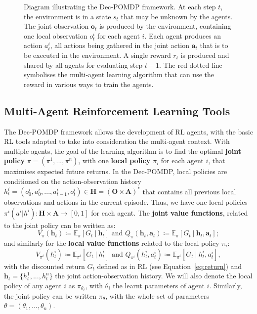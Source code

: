 \begin{figure}
    \centering
    
    \caption{Diagram illustrating the Dec-POMDP framework. At each step $t$, the environment is in a state $s_t$ that may be unknown by the agents. The joint observation $\mathbf{o}_t$ is produced by the environment, containing one local observation $o^i_t$ for each agent $i$. Each agent produces an action $a^i_t$, all actions being gathered in the joint action $\mathbf{a}_t$ that is to be executed in the environment. A single reward $r_t$ is produced and shared by all agents for evaluating step $t-1$. The red dotted line symbolises the multi-agent learning algorithm that can use the reward in various ways to train the agents.}
    \label{fig:DecPOMDP}
\end{figure}



\subsection{Multi-Agent Reinforcement Learning Tools}\label{sec:MAL:MARL_tools}

The Dec-POMDP framework allows the development of RL agents, with the basic RL tools adapted to take into consideration the multi-agent context. With multiple agents, the goal of the learning algorithm is to find the optimal \textbf{joint policy} $\pi=(\pi^1,...,\pi^n)$, with one \textbf{local policy} $\pi_i$ for each agent $i$, that maximises expected future returns. In the Dec-POMDP, local policies are conditioned on the action-observation history $h^i_t=(o^i_0,a^i_0,...,a^i_{t-1},o^i_t)\in \mathbf{H}=(\mathbf{O}\times\mathbf{A})^*$ that contains all previous local observations and actions in the current episode. Thus, we have one local policies $\pi^i(a^i|h^i):\mathbf{H}\times\mathbf{A}\rightarrow[0,1]$ for each agent. The \textbf{joint value functions}, related to the joint policy can be written as:
\begin{equation}
    V_\pi(\mathbf{h}_t)\coloneqq\mathbb{E}_\pi[G_t\ |\ \mathbf{h}_t]\text{ and }Q_\pi(\mathbf{h}_t,\mathbf{a}_t)\coloneqq\mathbb{E}_\pi[G_t\ |\ \mathbf{h}_t,\mathbf{a}_t]; \label{eq:JointValue}
\end{equation}
and similarly for the \textbf{local value functions} related to the local policy $\pi_i$:
\begin{equation}
    V_{\pi^i}(h^i_t)\coloneqq\mathbb{E}_{\pi^i}[G_t\ |\ h^i_t]\text{ and }Q_{\pi^i}(h^i_t,a^i_t)\coloneqq\mathbb{E}_{\pi^i}[G_t\ |\ h^i_t,a^i_t], \label{eq:LocalValue}
\end{equation}
with the discounted return $G_t$ defined as in RL (see Equation~\ref{eq:return}) and $\mathbf{h}_t=\{h^1_t,...,h^n_t\}$ the joint action-observation history. We will also denote the local policy of any agent $i$ as $\pi_{\theta_i}$, with $\theta_i$ the learnt parameters of agent $i$. Similarly, the joint policy can be written $\pi_\theta$, with the whole set of parameters $\theta=(\theta_1,...,\theta_n)$. 

